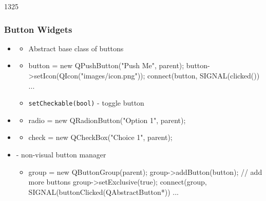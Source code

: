 \begin{slide}[fragile]{1325}
  \frametitle{Button Widgets}
 \begin{itemize}
  \item \textbf{}
    \begin{itemize}
    \item Abstract base class of buttons
   \end{itemize}
  \item \textbf{}
    \begin{itemize}
    \item[]
      \begin{cpp}
button = new QPushButton("Push Me", parent);
button->setIcon(QIcon("images/icon.png"));
connect(button, SIGNAL(clicked()) ...
      \end{cpp}
    \item \texttt{setCheckable(bool)} - toggle button
    \end{itemize}
 \item \textbf{}
   \begin{itemize}
   \item[]
     \begin{cpp}
radio = new QRadionButton("Option 1", parent);
     \end{cpp}
   \end{itemize}
  \item \textbf{}
    \begin{itemize}
     \item[] \begin{cpp}
check = new QCheckBox("Choice 1", parent);
     \end{cpp}
  \end{itemize}
  \item \textbf{} - non-visual button manager
    \begin{itemize}
   \item[]
     \begin{cpp}
group = new QButtonGroup(parent);
group->addButton(button); // add more buttons
group->setExclusive(true);
connect(group, SIGNAL(buttonClicked(QAbstractButton*)) ...
     \end{cpp}
   \end{itemize}
  \end{itemize}
\end{slide}


